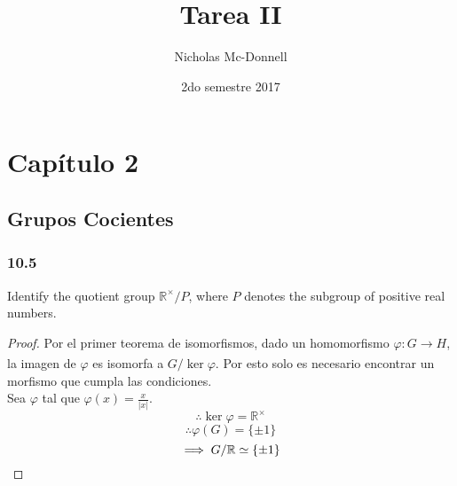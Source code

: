 \documentclass[11pt]{article}
\title{Tarea II}
\author{Nicholas Mc-Donnell}
\date{2do semestre 2017}
\newcommand{\set}[1]{\mathbb{#1}}
\newcommand{\func}[5]{#1:#2\xrightarrow[#5]{#4}#3}
\theoremstyle{definition}
\begin{document}
\maketitle

\newpage
\tableofcontents

\newpage
{}

\section{Capítulo 2}
\subsection{Grupos Cocientes}
\subsubsection{10.5}
Identify the quotient group $\set{R}^\times/P$, where $P$ denotes the subgroup of positive real numbers.
\begin{proof}
    Por el primer teorema de isomorfismos, dado un homomorfismo $\func{\varphi}{G}{H}{}{}$, la imagen de $\varphi$ es isomorfa a $G/\ker\varphi$. Por esto solo es necesario encontrar un morfismo que cumpla las condiciones.\\
    Sea $\varphi$ tal que $\varphi(x)=\frac{x}{|x|}$.
    \[\therefore \ker\varphi=\set{R}^\times\]
    \[\therefore \varphi(G)=\{\pm 1\}\]
    \[\implies G/\set{R}\simeq \{\pm 1\}\qedhere\]
\end{proof}
\end{document}
